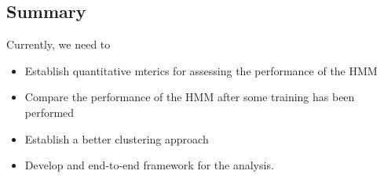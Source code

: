 \subsection{Summary}

Currently, we need to

\begin{itemize}
	\item Establish quantitative mterics for assessing the performance of the HMM
	\item Compare the performance of the HMM after some training has been performed
	\item Establish a better clustering approach
	\item Develop and end-to-end framework for the analysis.
\end{itemize}
